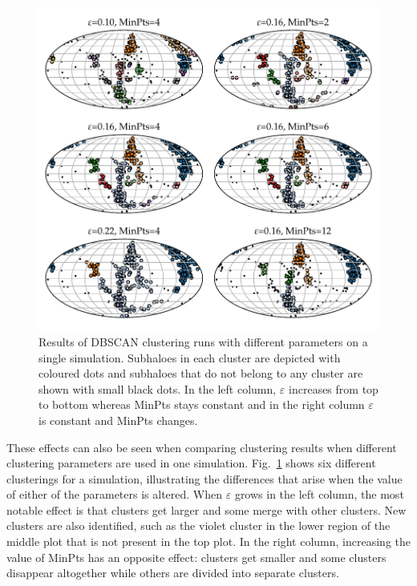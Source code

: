 \documentclass[english, twoside]{HYgradu}
\begin{document}
\begin{figure}
    \centering
    \includegraphics{kuvat/clusteringExamples.pdf}
    \caption{Results of DBSCAN clustering runs with different parameters on a single simulation. Subhaloes in each cluster are depicted with coloured dots and subhaloes that do not belong to any cluster are shown with small black dots. In the left column, $\varepsilon$ increases from top to bottom whereas MinPts stays constant and in the right column $\varepsilon$ is constant and MinPts changes.}\label{fig:clusteringExamples}
\end{figure}

These effects can also be seen when comparing clustering results when different clustering parameters are used in one simulation. Fig.~\ref{fig:clusteringExamples} shows six different clusterings for a simulation, illustrating the differences that arise when the value of either of the parameters is altered. When $\varepsilon$ grows in the left column, the most notable effect is that clusters get larger and some merge with other clusters. New clusters are also identified, such as the violet cluster in the lower region of the middle plot that is not present in the top plot. In the right column, increasing the value of MinPts has an opposite effect: clusters get smaller and some clusters disappear altogether while others are divided into separate clusters.
\end{document}
